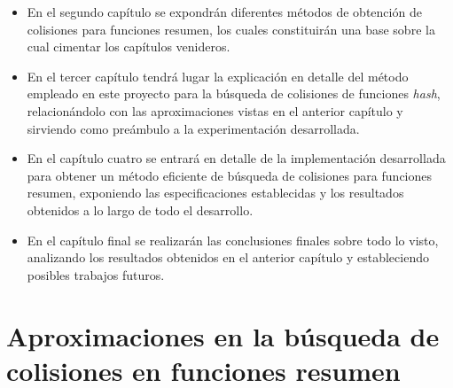\documentclass[12pt,spanish,listoffigures,listoftables,listofalgorithms]{tfgetsinf}
\newcommand{\hash}{\textit{hash}}
\begin{document}
\begin{itemize}

	\item En el segundo capítulo se expondrán diferentes métodos de obtención de colisiones para funciones resumen, los cuales constituirán una base sobre la cual cimentar los capítulos venideros.

	\item En el tercer capítulo tendrá lugar la explicación en detalle del método empleado en este proyecto para la búsqueda de colisiones de funciones \hash, relacionándolo con las aproximaciones vistas en el anterior capítulo y sirviendo como preámbulo a la experimentación desarrollada.

	\item En el capítulo cuatro se entrará en detalle de la implementación desarrollada para obtener un método eficiente de búsqueda de colisiones para funciones resumen, exponiendo las especificaciones establecidas y los resultados obtenidos a lo largo de todo el desarrollo.

	\item En el capítulo final se realizarán las conclusiones finales sobre todo lo visto, analizando los resultados obtenidos en el anterior capítulo y estableciendo posibles trabajos futuros.

\end{itemize}

%


\chapter{Aproximaciones en la búsqueda de colisiones en funciones resumen}
\end{document}
